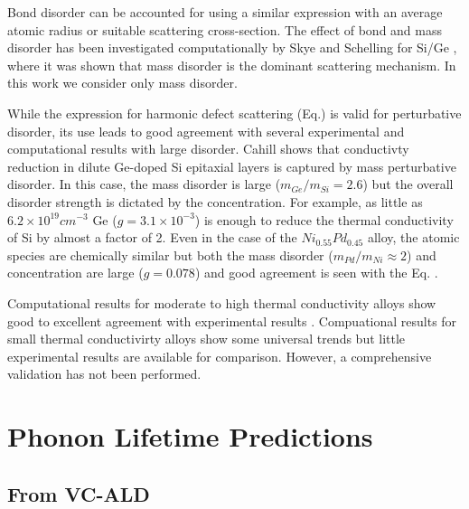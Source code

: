 \documentclass[aps,prb,twocolumn,superscriptaddress,preprintnumbers,amsmath,amssymb,floatfix]{revtex4}
\begin{document}
Bond disorder 
can be accounted for using a similar expression with an average
atomic radius or suitable scattering cross-section.
\cite{klemens_scattering_1955,klemens_thermal_1957} 
The effect of bond and mass disorder has been investigated computationally 
by Skye and 
Schelling for Si/Ge \cite{skye_thermal_2008}, 
where it was shown that mass disorder is 
the dominant scattering mechanism. In this work we consider only 
mass disorder.

While the
expression for harmonic defect scattering (Eq.) is valid for
perturbative disorder, its use leads to good agreement with
several experimental and computational results with large disorder.  
Cahill shows that conductivty reduction in dilute 
Ge-doped Si epitaxial layers 
is captured by mass perturbative disorder.\cite{cahill_thermal_2005} 
In this case, the mass disorder is large ($m_{Ge}/m_{Si} = 2.6$) 
but the overall disorder strength is dictated by the concentration. 
For example, as little as $6.2\times10^{19} cm^{-3}$ Ge
($g = 3.1\times10^{-3}$) is enough to reduce the thermal conductivity of 
Si by almost a factor of 2.\cite{cahill_thermal_2004}
Even in the
case of the $Ni_{0.55}Pd_{0.45}$ alloy, the atomic species
are chemically similar but both the mass disorder 
($m_{Pd}/m_{Ni} \approx 2$) and concentration are large ($g=0.078$) 
and good agreement is seen with the Eq. .
\cite{kamitakahara_vibrations_1974}

Computational results for moderate to high thermal conductivity 
alloys show good to excellent agreement with experimental results
\cite{thermal_shiomi_2011,garg_role_2011,lindsay_thermal_2012}.
Compuational results for small thermal conductivirty alloys 
show some universal trends but little experimental results are 
available for comparison.\cite{tian_phonon_2012} However, a 
comprehensive validation has not been performed.

\section{\label{S:}Phonon Lifetime Predictions}

\subsection{\label{S:Lifetimes}From VC-ALD}
\end{document}
